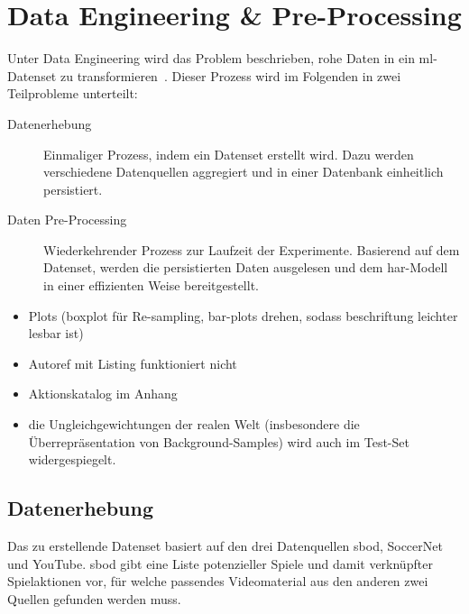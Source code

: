 \chapter{Data Engineering \& Pre-Processing}
\label{ch:data}

\newcommand{\noaction}{37521\ }
\newcommand{\novideos}{194\ }
\newcommand{\nomatches}{152\ }

Unter Data Engineering wird das Problem beschrieben, rohe Daten in ein \gls{ml}-Datenset zu transformieren~\cite{Burkov19}.
Dieser Prozess wird im Folgenden in zwei Teilprobleme unterteilt:
\begin{description}
    \item[Datenerhebung] Einmaliger Prozess, indem ein Datenset erstellt wird.
        Dazu werden verschiedene Datenquellen aggregiert und in einer Datenbank einheitlich persistiert.
    \item[Daten Pre-Processing] Wiederkehrender Prozess zur Laufzeit der Experimente.
        Basierend auf dem Datenset, werden die persistierten Daten ausgelesen und dem \gls{har}-Modell in einer effizienten Weise bereitgestellt.
\end{description}

\begin{tcolorbox}[title=WIP]
    \begin{itemize}
        \item Plots (boxplot für Re-sampling, bar-plots drehen, sodass beschriftung leichter lesbar ist)
        \item Autoref mit Listing funktioniert nicht
        \item Aktionskatalog im Anhang
        \item \Dh die Ungleichgewichtungen der realen Welt (insbesondere die Überrepräsentation von Background-Samples) wird auch im Test-Set widergespiegelt.
    \end{itemize}
\end{tcolorbox}


\section{Datenerhebung}
\label{sec:datenerhebung}

Das zu erstellende Datenset basiert auf den drei Datenquellen \gls{sbod}, SoccerNet und YouTube.
\gls{sbod} gibt eine Liste potenzieller Spiele und damit verknüpfter Spielaktionen vor, für welche passendes Videomaterial aus den anderen zwei Quellen gefunden werden muss.

